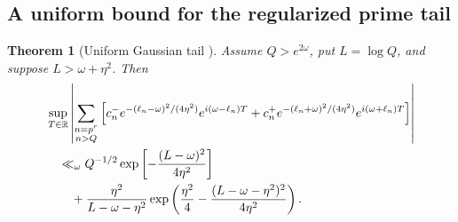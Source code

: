 \documentclass[11pt]{amsart}
\numberwithin{equation}{section}
\theoremstyle{plain}
\newtheorem{theorem}{Theorem}[section]
\theoremstyle{definition}
\theoremstyle{remark}
\newcommand{\1}{\mathbf{1}}
\begin{document}
\subsection{A uniform bound for the regularized prime tail}
\label{subsec:regularized_tail_bound}


\begin{theorem}[Uniform Gaussian tail {}]
\label{thm:uniform_gaussian_tail}
Assume \(Q>e^{2\omega}\), put \(L=\log Q\), and suppose
\(L>\omega+\eta^2\).  Then
\begin{align}
&\sup_{T\in\mathbb R}
\left|
\sum_{\substack{n=p^r\\n>Q}}
\left[
 c_n^-e^{-(\ell_n-\omega)^2/(4\eta^2)}e^{i(\omega-\ell_n)T}
+c_n^+e^{-(\ell_n+\omega)^2/(4\eta^2)}e^{i(\omega+\ell_n)T}
\right]
\right|
\notag
\\
&\quad\ll_\omega
Q^{-1/2}
\exp\left[-\frac{(L-\omega)^2}{4\eta^2}\right]
\label{eq:uniform_gaussian_tail_endpoint}
\\
&\qquad+
\frac{\eta^2}{L-\omega-\eta^2}
\exp\left(
\frac{\eta^2}{4}
-
\frac{(L-\omega-\eta^2)^2}{4\eta^2}
\right).
\label{eq:uniform_gaussian_tail}
\end{align}
\end{theorem}
\end{document}
